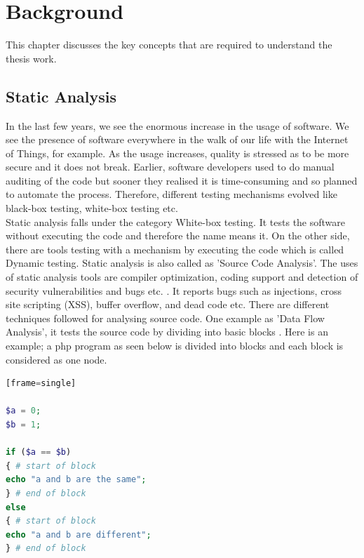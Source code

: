 \chapter{Background}
\label{ch:background}

This chapter discusses the key concepts that are required to understand the thesis work.

\section{Static Analysis}

In the last few years, we see the enormous increase in the usage of software. We see the presence of software everywhere in the walk of our life with the Internet of Things, for example. As the usage increases, quality is stressed as to be more secure and it does not break. Earlier, software developers used to do manual auditing of the code but sooner they realised it is time-consuming and so planned to automate the process. Therefore, different testing mechanisms evolved like black-box testing, white-box testing etc. \\

Static analysis falls under the category White-box testing. It tests the software without executing the code and therefore the name means it. On the other side, there are tools testing with a mechanism by executing the code which is called Dynamic testing. Static analysis is also called as 'Source Code Analysis'. The uses of static analysis tools are compiler optimization, coding support and detection of security vulnerabilities and bugs etc. \cite{deca}. It reports bugs such as injections, cross site scripting (XSS), buffer overflow, and dead code etc. \cite{bugs} There are different techniques followed for analysing source code. One example as 'Data Flow Analysis', it tests the source code by dividing into basic blocks \cite{Woegerer}. Here is an example; a php program as seen below is divided into blocks and each block is considered as one node.

\begin{lstlisting}[showstringspaces=false, language=PHP][frame=single]

$a = 0;
$b = 1;

if ($a == $b)
{ # start of block
echo "a and b are the same";
} # end of block
else
{ # start of block
echo "a and b are different";
} # end of block


\end{lstlisting}

